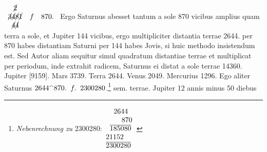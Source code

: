 $\protect\begin{array}{ccc}\cancel{2}&&\\\cancel{3}\cancel{4}\cancel{8}\cancel{1}&f&870.\\\cancel{4}\cancel{4}&&\end{array}$  Ergo Saturnus\protect{} abesset tantum  a sole\protect{} 870 vicibus amplius  quam terra\protect{} a sole\protect{}, et Jupiter\protect{} 144  vicibus, ergo multipliciter distantia terrae\protect{} 2644. per 870 habes distantiam Saturni\protect{} per 144 habes Jovis\protect{}, si  huic methodo insistendum est. Sed Autor  aliam sequitur simul quadratum  distantiae terrae\protect{} et multiplicat per  periodum, inde extrahit radicem, Saturnus\protect{} ei distat a sole\protect{}  terrae\protect{} 14360. Jupiter\protect{} [9159]. Mars\protect{} 3739. Terra\protect{} 2644. Venus\protect{} 2049. Mercurius\protect{} 1296.  Ego aliter Saturnus\protect{} $2644^\smallfrown 870.\hspace{5.5pt}f.\hspace{5.5pt}2300280$.\footnote{\textit{Nebenrechnung zu} 2300280:\newline$\protect\begin{array}{l}\hspace{11pt}2644\\\hspace{22pt}870\\\hspace{5.5pt}\overline{185080}\\21152\\\overline{2300280}
 \protect\end{array}$} sem. terrae\protect{}. Jupiter\protect{} 12 annis minus 50  diebus 
